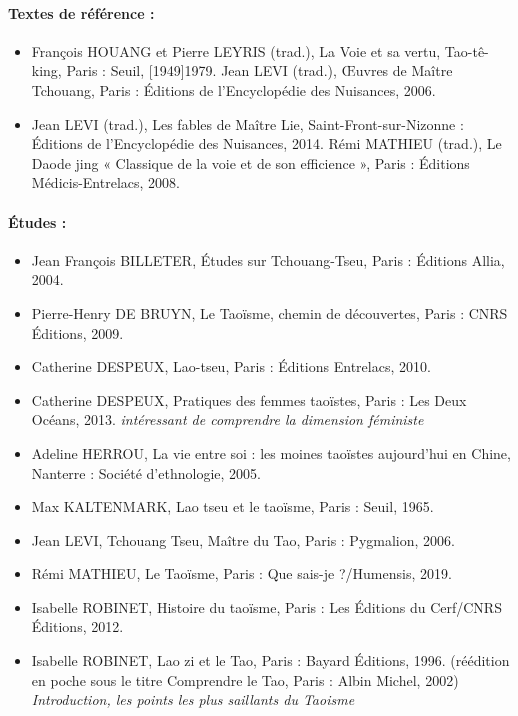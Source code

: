 \paragraph{Textes de référence :}


\begin{itemize}
    \item François HOUANG et Pierre LEYRIS (trad.), La Voie et sa vertu, Tao-tê-king, Paris : Seuil, [1949]1979.
Jean LEVI (trad.), Œuvres de Maître Tchouang, Paris : Éditions de l'Encyclopédie des Nuisances, 2006.
    \item Jean LEVI (trad.), Les fables de Maître Lie, Saint-Front-sur-Nizonne : Éditions de l’Encyclopédie des Nuisances, 2014. 
Rémi MATHIEU (trad.), Le Daode jing « Classique de la voie et de son efficience », Paris : Éditions Médicis-Entrelacs, 2008.  

\end{itemize}

\paragraph{Études :}

\begin{itemize}
    \item Jean François BILLETER, Études sur Tchouang-Tseu, Paris : Éditions Allia, 2004.
        \item Pierre-Henry DE BRUYN, Le Taoïsme, chemin de découvertes, Paris : CNRS Éditions, 2009. 
    \item Catherine DESPEUX, Lao-tseu, Paris : Éditions Entrelacs, 2010.
    \item Catherine DESPEUX, Pratiques des femmes taoïstes, Paris : Les Deux Océans, 2013. \textit{intéressant de comprendre la dimension féministe}
    \item Adeline HERROU, La vie entre soi : les moines taoïstes aujourd’hui en Chine, Nanterre : Société d’ethnologie, 2005.
    \item Max KALTENMARK, Lao tseu et le taoïsme, Paris : Seuil, 1965. 
        \item Jean LEVI, Tchouang Tseu, Maître du Tao, Paris : Pygmalion, 2006.
            \item Rémi MATHIEU, Le Taoïsme, Paris : Que sais-je ?/Humensis, 2019.

    \item Isabelle ROBINET, Histoire du taoïsme, Paris : Les Éditions du Cerf/CNRS Éditions, 2012.
    
    \item Isabelle ROBINET, Lao zi et le Tao, Paris : Bayard Éditions, 1996. 
    (réédition en poche sous le titre Comprendre le Tao, Paris : Albin Michel, 2002) \textit{Introduction, les points les plus saillants du Taoisme}

\end{itemize}







